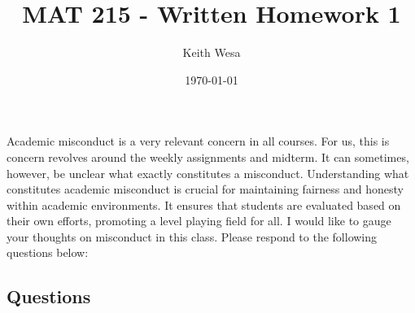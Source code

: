 \documentclass{article}
\author{Keith Wesa}
\title{MAT 215 - Written Homework 1}
\date{\today}
\begin{document}
\section*{}
Academic misconduct is a very relevant concern in all courses. For us, this is
concern revolves around the weekly assignments and midterm. It can sometimes,
however, be unclear what exactly constitutes a misconduct. Understanding what
constitutes academic misconduct is crucial for maintaining fairness and honesty
within academic environments. It ensures that students are evaluated based on
their own efforts, promoting a level playing field for all. I would like to gauge your
thoughts on misconduct in this class.
\newline
\newline
Please respond to the following questions below:
\subsection*{Questions}
\end{document}
